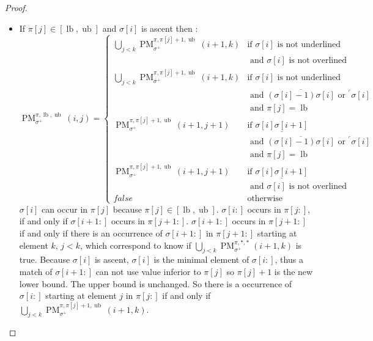 \documentclass[a4paper]{llncs}
\newcommand{\ptext}{\pi}
\newcommand{\pmotif}{\sigma}
\newcommand{\pbmotif}{\pmotif^+}
\DeclareMathOperator{\PMa}{PM}
\newcommand{\PM}[6]{\PMa_{{#1}}^{{#2},{#3},{#4}}({#5},{#6})}
\DeclareMathOperator{\lb}{lb}
\DeclareMathOperator{\ub}{ub}
\begin{document}
\begin{proof}
\begin{itemize}
	\item If $\ptext[j] \in [\lb,\ub]$ and $\pmotif[i]$ is ascent then :
	$$
	\PM{\pbmotif}{\ptext}{\lb}{\ub}{i}{j}= 
	\begin{cases}
		\bigcup_{j<k} \PM{\pbmotif}{\ptext}{\ptext[j]+1}{\ub}{i+1}{k}
			& \text{if $\pmotif[i]$ is not underlined } \\
			& \text{ and $\pmotif[i]$ is not overlined} \\ 
		\bigcup_{j<k} \PM{\pbmotif}{\ptext}{\ptext[j]+1}{\ub}{i+1}{k}
			& \text{if $\pmotif[i]$ is not underlined } \\
			& \text{ and $\overline{(\pmotif[i]-1)\pmotif[i]}$ or $^\ulcorner{\pmotif[i]}$}\\ 	
			& \text{ and $\ptext[j]=\lb$} \\
		\PM{\pbmotif}{\ptext}{\ptext[j]+1}{\ub}{i+1}{j+1}	
			& \text{if $\underline{\pmotif[i]\pmotif[i+1]}$ } \\
			& \text{ and $\overline{(\pmotif[i]-1)\pmotif[i]}$ or $^\ulcorner{\pmotif[i]}$}\\ 	
			& \text{ and $\ptext[j]=\lb$} \\				
		\PM{\pbmotif}{\ptext}{\ptext[j]+1}{\ub}{i+1}{j+1}	
			& \text{if $\underline{\pmotif[i]\pmotif[i+1]}$ } \\
			& \text{ and $\pmotif[i]$ is not overlined} \\
		false & \text{otherwise}
		 	
	\end{cases}
	$$	
	$\pmotif[i]$ can occur in $\ptext[j]$ because $\ptext[j] \in [\lb,\ub]$. $\pmotif[i:]$ occurs in $\ptext[j:]$, if and only if $\pmotif[i+1:]$ occurs in $\ptext[j+1:]$. $\pmotif[i+1:]$ occurs in $\ptext[j+1:]$ if and only if there is an occurrence of $\pmotif[i+1:]$ in $\ptext[j+1:]$ starting at element $k$, $j<k$, which correspond to know if $\bigcup_{j<k} \PM{\pbmotif}{\ptext}{*}{*}{i+1}{k}$ is true. Because $\pmotif[i]$ is ascent,  $\pmotif[i]$ is the minimal element of $\pmotif[i:]$, thus a match of $\pmotif[i+1:]$ can not use value inferior to $\ptext[j]$ so $\ptext[j]+1$ is the new lower bound. The upper bound is unchanged. So there is a occurrence of  $\pmotif[i:]$ starting at element $j$ in $\ptext[j:]$ if and only if $\bigcup_{j<k} \PM{\pbmotif}{\ptext}{\ptext[j]+1}{\ub}{i+1}{k}$. 
	

\end{itemize}
\end{proof}
\end{document}
